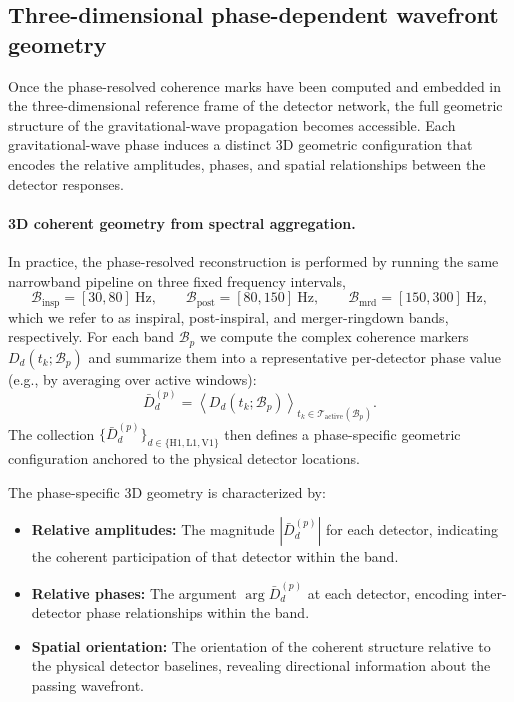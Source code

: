 \documentclass[11pt,a4paper]{article}
\begin{document}
\subsection{Three-dimensional phase-dependent wavefront geometry}
\label{sec:phase_triangles}

Once the phase-resolved coherence marks have been computed and embedded in the
three-dimensional reference frame of the detector network, the full geometric structure
of the gravitational-wave propagation becomes accessible.
Each gravitational-wave phase induces a distinct 3D geometric configuration that encodes
the relative amplitudes, phases, and spatial relationships between the detector responses.

\paragraph{3D coherent geometry from spectral aggregation.}
In practice, the phase-resolved reconstruction is performed by running the same
narrowband pipeline on three fixed frequency intervals,
\begin{equation}
\mathcal{B}_{\mathrm{insp}}=[30,80]~\mathrm{Hz},\qquad
\mathcal{B}_{\mathrm{post}}=[80,150]~\mathrm{Hz},\qquad
\mathcal{B}_{\mathrm{mrd}}=[150,300]~\mathrm{Hz},
\end{equation}
which we refer to as inspiral, post-inspiral, and merger-ringdown bands, respectively.
For each band $\mathcal{B}_p$ we compute the complex coherence markers $D_d(t_k;\mathcal{B}_p)$
and summarize them into a representative per-detector phase value (e.g., by averaging over
active windows):
\begin{equation}
\bar{D}_d^{(p)} = \left\langle D_d(t_k;\mathcal{B}_p) \right\rangle_{t_k\in\mathcal{T}_{\mathrm{active}}(\mathcal{B}_p)}.
\end{equation}
The collection $\{\bar{D}_d^{(p)}\}_{d\in\{\mathrm{H1},\mathrm{L1},\mathrm{V1}\}}$ then defines a phase-specific
geometric configuration anchored to the physical detector locations.

The phase-specific 3D geometry is characterized by:
\begin{itemize}
\item \textbf{Relative amplitudes:} The magnitude $|\bar{D}_d^{(p)}|$ for each detector, indicating
the coherent participation of that detector within the band.
\item \textbf{Relative phases:} The argument $\arg\bar{D}_d^{(p)}$ at each detector, encoding
inter-detector phase relationships within the band.
\item \textbf{Spatial orientation:} The orientation of the coherent structure relative to the
physical detector baselines, revealing directional information about the passing wavefront.
\end{itemize}
\end{document}

